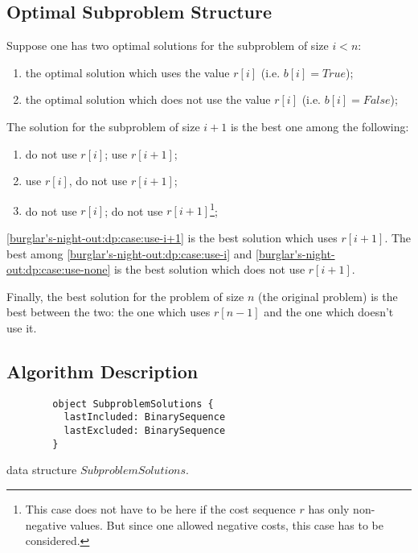 \subsection{Optimal Subproblem Structure}

Suppose one has two optimal solutions for the subproblem of size $i < n$:

\begin{enumerate}
    \item the optimal solution which uses the value $r[i]$ (i.e. $b[i] = True$);
    \item the optimal solution which does not use the value $r[i]$ (i.e. $b[i] = False$);
\end{enumerate}

The solution for the subproblem of size $i+1$ is the best one among the following:

\begin{enumerate}
    \item\label{burglar's-night-out:dp:case:use-i+1} do not use $r[i]$; use $r[i+1]$;
    \item\label{burglar's-night-out:dp:case:use-i} use $r[i]$, do not use $r[i+1]$;
    \item\label{burglar's-night-out:dp:case:use-none} do not use $r[i]$; do not use $r[i+1]$\footnote{This case does not have to be here if the cost sequence $r$ has only non-negative values. But since one allowed negative costs, this case has to be considered.};
\end{enumerate}

\ref{burglar's-night-out:dp:case:use-i+1} is the best solution which uses $r[i+1]$. The best among \ref{burglar's-night-out:dp:case:use-i} and \ref{burglar's-night-out:dp:case:use-none} is the best solution which does not use $r[i+1]$.

Finally, the best solution for the problem of size $n$ (the original problem) is the best between the two: the one which uses $r[n-1]$ and the one which doesn't use it.

\subsection{Algorithm Description}

\begin{algorithm}
    \begin{lstlisting}
        object SubproblemSolutions {
          lastIncluded: BinarySequence
          lastExcluded: BinarySequence
        }
    \end{lstlisting}
    \caption{data structure $SubproblemSolutions$.}
\end{algorithm}


